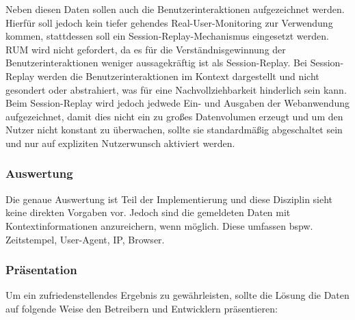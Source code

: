 	Neben diesen Daten sollen auch die Benutzerinteraktionen aufgezeichnet werden. Hierfür soll jedoch kein tiefer gehendes Real-User-Monitoring zur Verwendung kommen, stattdessen soll ein Session-Replay-Mechanismus eingesetzt werden. RUM wird nicht gefordert, da es für die Verständnisgewinnung der Benutzerinteraktionen weniger aussagekräftig ist als Session-Replay. Bei Session-Replay werden die Benutzerinteraktionen im Kontext dargestellt und nicht gesondert oder abstrahiert, was für eine Nachvollziehbarkeit hinderlich sein kann. Beim Session-Replay wird jedoch jedwede Ein- und Ausgaben der Webanwendung aufgezeichnet, damit dies nicht ein zu großes Datenvolumen erzeugt und um den Nutzer nicht konstant zu überwachen, sollte sie standardmäßig abgeschaltet sein und nur auf expliziten Nutzerwunsch aktiviert werden.
	
	\vspace{-0.75\baselineskip}
	\subsubsection{Auswertung}
	\vspace{-0.50\baselineskip}
	
	Die genaue Auswertung ist Teil der Implementierung und diese Disziplin sieht keine direkten Vorgaben vor. Jedoch sind die gemeldeten Daten mit Kontextinformationen anzureichern, wenn möglich. Diese umfassen bspw. Zeitstempel, User-Agent, IP, Browser.
	
	\vspace{-0.75\baselineskip}
	\subsubsection{Präsentation}
	\vspace{-0.50\baselineskip}
	
	Um ein zufriedenstellendes Ergebnis zu gewährleisten, sollte die Lösung die Daten auf folgende Weise den Betreibern und Entwicklern präsentieren:
	

